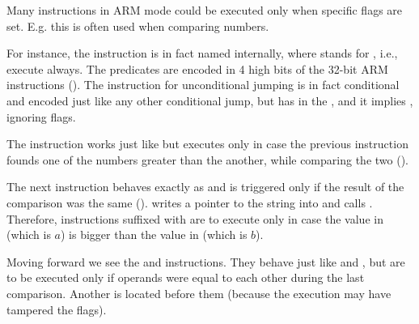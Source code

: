 \label{subsec:jcc_ARM}

\myparagraphold{\OptimizingKeilVI (\ARMMode)}




Many instructions in ARM mode could be executed only when specific flags are set.
E.g. this is often used when comparing numbers.


For instance, the \ADD instruction is in fact named  internally, where  stands for
, i.e., execute always.
The predicates are encoded in 4 high bits of the 32-bit ARM instructions ().
The  instruction for unconditional jumping is in fact conditional and encoded just like any other
conditional jump, but has  in the , and it implies , 
ignoring flags.


The  instruction works just like  but executes only in case the previous \CMP
instruction founds one of the numbers greater than the another, while comparing the two ().


The next  instruction behaves exactly as  
and is triggered only if the result of the comparison was the same (). 
 writes a pointer to the string  into  and  calls \printf.
Therefore, instructions suffixed with  are to execute only in case the value in  (which is $a$) is bigger than the value in  (which is $b$).


Moving forward we see the  and  instructions.
They behave just like  and , but are to be executed only if operands were equal to each
other during the last comparison.
Another \CMP is located before them (because the \printf execution may have tampered the flags).

